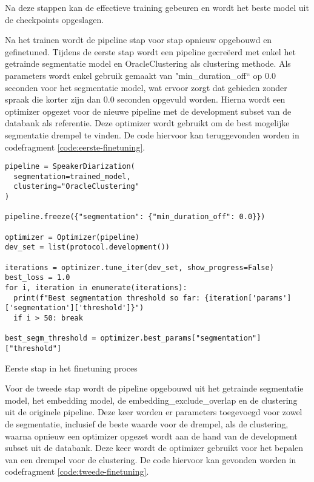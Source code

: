 Na deze stappen kan de effectieve training gebeuren en wordt het beste model uit de checkpoints opgeslagen.

Na het trainen wordt de pipeline stap voor stap opnieuw opgebouwd en gefinetuned. Tijdens de eerste stap wordt een pipeline gecreëerd met enkel het getrainde segmentatie model en OracleClustering als clustering methode. Als parameters wordt enkel gebruik gemaakt van "min\_duration\_off`` op 0.0 seconden voor het segmentatie model, wat ervoor zorgt dat gebieden zonder spraak die korter zijn dan 0.0 seconden opgevuld worden. Hierna wordt een optimizer opgezet voor de nieuwe pipeline met de development subset van de databank als referentie. Deze optimizer wordt gebruikt om de best mogelijke segmentatie drempel te vinden. De code hiervoor kan teruggevonden worden in codefragment \ref{code:eerste-finetuning}.

\begin{listing}
	\begin{verbatim}
pipeline = SpeakerDiarization(
  segmentation=trained_model,
  clustering="OracleClustering"
)

pipeline.freeze({"segmentation": {"min_duration_off": 0.0}})

optimizer = Optimizer(pipeline)
dev_set = list(protocol.development())

iterations = optimizer.tune_iter(dev_set, show_progress=False)
best_loss = 1.0
for i, iteration in enumerate(iterations):
  print(f"Best segmentation threshold so far: {iteration['params']['segmentation']['threshold']}")
  if i > 50: break
    
best_segm_threshold = optimizer.best_params["segmentation"]["threshold"]
	\end{verbatim}
	\caption[Set-up voor eerste finetuning]{\label{code:eerste-finetuning}Eerste stap in het finetuning proces}
\end{listing}

Voor de tweede stap wordt de pipeline opgebouwd uit het getrainde segmentatie model, het embedding model, de embedding\_exclude\_overlap en de clustering uit de originele pipeline. Deze keer worden er parameters toegevoegd voor zowel de segmentatie, inclusief de beste waarde voor de drempel, als de clustering, waarna opnieuw een optimizer opgezet wordt aan de hand van de development subset uit de databank. Deze keer wordt de optimizer gebruikt voor het bepalen van een drempel voor de clustering. De code hiervoor kan gevonden worden in codefragment \ref{code:tweede-finetuning}.

